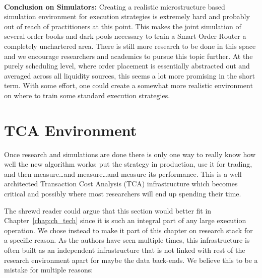 \noindent{} \\


\noindent\textbf{Conclusion on Simulators:} Creating a realistic microstructure based simulation environment for execution strategies is extremely hard and probably out of reach of practitioners at this point. This makes the joint simulation of several order books and dark pools necessary to train a Smart Order Router a completely unchartered area. There is still more research to be done in this space and we encourage researchers and academics to pursue this topic further. At the purely scheduling level, where order placement is essentially abstracted out and averaged across all liquidity sources, this seems a lot more promising in the short term. With some effort, one could create a somewhat more realistic environment on where to train some standard execution strategies.



\section{TCA Environment}

Once research and simulations are done there is only one way to really know how well the new algorithm works: put the strategy in production, use it for trading, and then measure\dots and measure\dots and measure its performance. This is a well architected Transaction Cost Analysis (TCA) infrastructure which becomes critical and possibly where most researchers will end up spending their time. 


The shrewd reader could argue that this section would better fit in Chapter~\ref{chap:ch_tech} since it is such an integral part of any large execution operation. We chose instead to make it part of this chapter on research stack for a specific reason. As the authors have seen multiple times, this infrastructure is often built as an independent infrastructure that is not linked with rest of the research environment apart for maybe the data back-ends. We believe this to be a mistake for multiple reasons:

